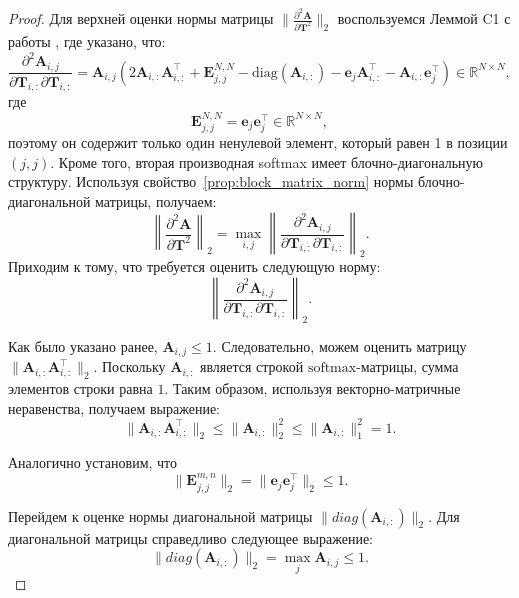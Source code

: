 \begin{proof}
Для верхней оценки нормы матрицы $\| \frac{\partial^2 \mathbf{A}}{\partial \mathbf{T}^2} \|_2$ воспользуемся Леммой C1 с работы \cite{ormaniec2024attentionhessian}, где указано, что:
\begin{equation}\label{chapter-2:theorem:proof_partialA}
    \frac{\partial^2 \mathbf{A}_{i,j}}{\partial \mathbf{T}_{i,:} \partial \mathbf{T}_{i,:}} = \mathbf{A}_{i,j} \left(2\mathbf{A}_{i,:}\mathbf{A}_{i,:}^{\top} + \mathbf{E}_{j,j}^{N,N} - \text{diag}(\mathbf{A}_{i,:}) - \mathbf{e}_j \mathbf{A}_{i,:}^{\top} - \mathbf{A}_{i,:}\mathbf{e}_j^{\top}\right) \in \mathbb{R}^{N \times N},
\end{equation}
где 
\[
    \mathbf{E}_{j,j}^{N, N} = \mathbf{e}_j \mathbf{e}_j^{\top} \in \mathbb{R}^{N \times N},
\]
поэтому он содержит только один ненулевой элемент, который равен 1 в позиции $(j, j)$.
Кроме того, вторая производная softmax имеет блочно-диагональную структуру. Используя свойство~\ref{prop:block_matrix_norm} нормы блочно-диагональной матрицы, получаем:
\[
    \left\|\frac{\partial^2 \mathbf{A}}{\partial \mathbf{T}^2}\right\|_2 = \max_{i,j} \left\|\frac{\partial^2 \mathbf{A}_{i,j}}{\partial \mathbf{T}_{i,:} \partial \mathbf{T}_{i,:}}\right\|_2.
\]
Приходим к тому, что требуется оценить следующую норму:
\[
    \left\|\frac{\partial^2 \mathbf{A}_{i,j}}{\partial \mathbf{T}_{i,:} \partial \mathbf{T}_{i,:}} \right\|_2.
\]

Как было указано ранее, $\mathbf{A}_{i,j} \leq 1$. Следовательно, можем оценить матрицу $\| \mathbf{A}_{i,:}\mathbf{A}_{i,:}^{\top} \|_2$. Поскольку $\mathbf{A}_{i,:}$ является строкой $\text{softmax}$-матрицы, сумма элементов строки равна $1$.
Таким образом, используя векторно-матричные неравенства, получаем выражение:
\begin{equation}\label{chapter-2:theorem:proof_Arow}
    \| \mathbf{A}_{i,:}\mathbf{A}_{i,:}^{\top} \|_2 \leq \|\mathbf{A}_{i,:}\|^2_2 \leq \|\mathbf{A}_{i,:}\|_1^2 = 1.
\end{equation}

Аналогично установим, что 
\begin{equation}\label{chapter-2:theorem:proof_Enorm}
    \|\mathbf{E}_{j,j}^{m,n}\|_2 = \| \mathbf{e}_j \mathbf{e}_j^{\top}\|_2 \leq 1.
\end{equation}

Перейдем к оценке нормы диагональной матрицы $\|diag(\mathbf{A}_{i,:})\|_2$.
Для диагональной матрицы справедливо следующее выражение:
\begin{equation}\label{chapter-2:theorem:proof_Adiag}
    \|diag(\mathbf{A}_{i,:})\|_2 = \max \limits_j \mathbf{A}_{i,j} \leq 1.
\end{equation}


\end{proof}
